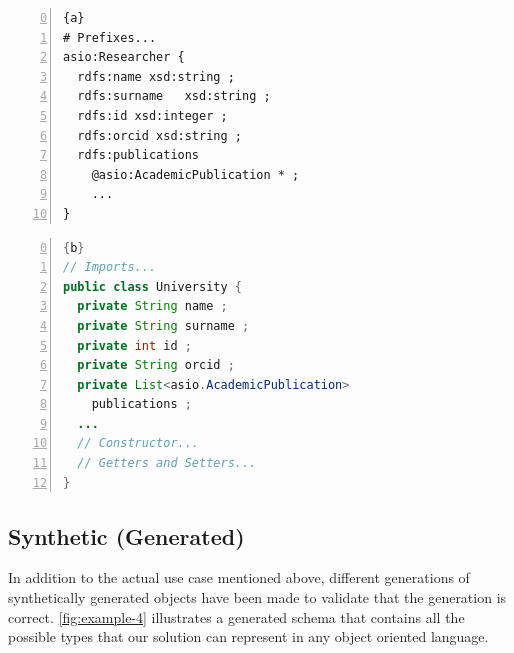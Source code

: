 \begin{center}
	\noindent\begin{minipage}[t]{.4\textwidth}
		\begin{lstlisting}[frame=topline,numbers=left,firstnumber=0,title=\scriptsize\texttt{Researcher.shexl}, basicstyle=\ttfamily\scriptsize]{a}
# Prefixes...
asio:Researcher {
  rdfs:name xsd:string ;
  rdfs:surname   xsd:string ;
  rdfs:id xsd:integer ;
  rdfs:orcid xsd:string ;
  rdfs:publications
    @asio:AcademicPublication * ;
	...
}
		\end{lstlisting}
	\end{minipage}\hfill
	\begin{minipage}[t]{.5\textwidth}
		\begin{lstlisting}[language=Java, frame=t,firstnumber=0,numbers=left,title=\scriptsize\texttt{Researcher.java}, basicstyle=\ttfamily\scriptsize]{b}
// Imports...
public class University {
  private String name ;
  private String surname ;
  private int id ;
  private String orcid ;
  private List<asio.AcademicPublication>
    publications ;
  ...
  // Constructor...
  // Getters and Setters...
}
		\end{lstlisting}
	\end{minipage}
	\label{fig:example-3}
\end{center}

\subsection{Synthetic (Generated)}
In addition to the actual use case mentioned above, different generations of synthetically generated objects have been made to validate that the generation is correct.
\cref{fig:example-4} illustrates a generated schema that contains all the possible types that our solution can represent in any object oriented language.

